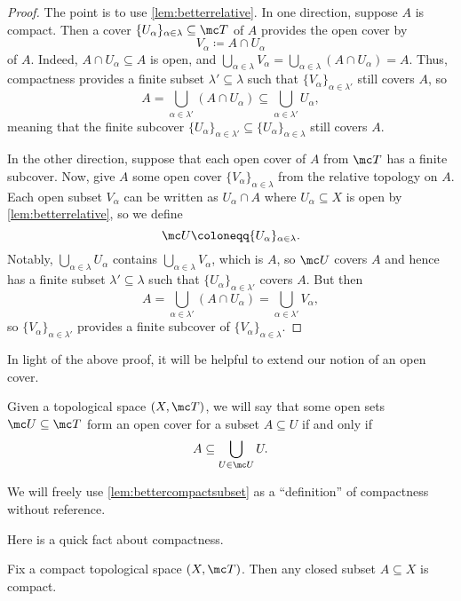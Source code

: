 \documentclass[../notes.tex]{subfiles}
\begin{document}
\begin{proof}
	The point is to use \autoref{lem:betterrelative}. In one direction, suppose $A$ is compact. Then a cover $\{U_\alpha\}_{\alpha\in\lambda}\subseteq\mc T$ of $A$ provides the open cover by
	\[V_\alpha\coloneqq A\cap U_\alpha\]
	of $A$. Indeed, $A\cap U_\alpha\subseteq A$ is open, and $\bigcup_{\alpha\in\lambda}V_\alpha=\bigcup_{\alpha\in\lambda}(A\cap U_\alpha)=A$. Thus, compactness provides a finite subset $\lambda'\subseteq\lambda$ such that $\{V_\alpha\}_{\alpha\in\lambda'}$ still covers $A$, so
	\[A=\bigcup_{\alpha\in\lambda'}(A\cap U_\alpha)\subseteq\bigcup_{\alpha\in\lambda'}U_\alpha,\]
	meaning that the finite subcover $\{U_\alpha\}_{\alpha\in\lambda'}\subseteq\{U_\alpha\}_{\alpha\in\lambda}$ still covers $A$.
	
	In the other direction, suppose that each open cover of $A$ from $\mc T$ has a finite subcover. Now, give $A$ some open cover $\{V_\alpha\}_{\alpha\in\lambda}$ from the relative topology on $A$. Each open subset $V_\alpha$ can be written as $U_\alpha\cap A$ where $U_\alpha\subseteq X$ is open by \autoref{lem:betterrelative}, so we define
	\[\mc U\coloneqq\{U_\alpha\}_{\alpha\in\lambda}.\]
	Notably, $\bigcup_{\alpha\in\lambda}U_\alpha$ contains $\bigcup_{\alpha\in\lambda}V_\alpha$, which is $A$, so $\mc U$ covers $A$ and hence has a finite subset $\lambda'\subseteq\lambda$ such that $\{U_\alpha\}_{\alpha\in\lambda'}$ covers $A$. But then
	\[A=\bigcup_{\alpha\in\lambda'}(A\cap U_\alpha)=\bigcup_{\alpha\in\lambda'}V_\alpha,\]
	so $\{V_\alpha\}_{\alpha\in\lambda'}$ provides a finite subcover of $\{V_\alpha\}_{\alpha\in\lambda}$.
\end{proof}
In light of the above proof, it will be helpful to extend our notion of an open cover.
\begin{notation}
	Given a topological space $(X,\mc T)$, we will say that some open sets $\mc U\subseteq\mc T$ form an open cover for a subset $A\subseteq U$ if and only if
	\[A\subseteq\bigcup_{U\in\mc U}U.\]
\end{notation}
\begin{remark}
	We will freely use \autoref{lem:bettercompactsubset} as a ``definition'' of compactness without reference.
\end{remark}
Here is a quick fact about compactness.
\begin{lemma} \label{lem:closedincompactiscompact}
	Fix a compact topological space $(X,\mc T)$. Then any closed subset $A\subseteq X$ is compact.
\end{lemma}
\end{document}
